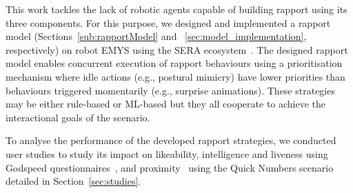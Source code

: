 This work tackles the lack of robotic agents capable of building rapport using its three components. For this purpose, we designed and implemented a rapport model (Sections~\ref{sub:rapportModel} and ~\ref{sec:model_implementation}, respectively) on robot \ac{EMYS} using the \ac{SERA} ecosystem~\cite{Tullio2015}. The designed rapport model enables concurrent execution of rapport behaviours using a prioritisation mechanism where idle actions (e.g., postural mimicry) have lower priorities than behaviours triggered momentarily (e.g., surprise animations). These strategies may be either rule-based or \ac{ML}-based but they all cooperate to achieve the interactional goals of the scenario.

To analyse the performance of the developed rapport strategies, we conducted user studies to study its impact on likeability, intelligence and liveness using Godspeed questionnaires~\cite{bartneck2009measurement, lehmann2015good}, and proximity~\cite{aron1992inclusion} using the Quick Numbers scenario detailed in Section~\ref{sec:studies}.